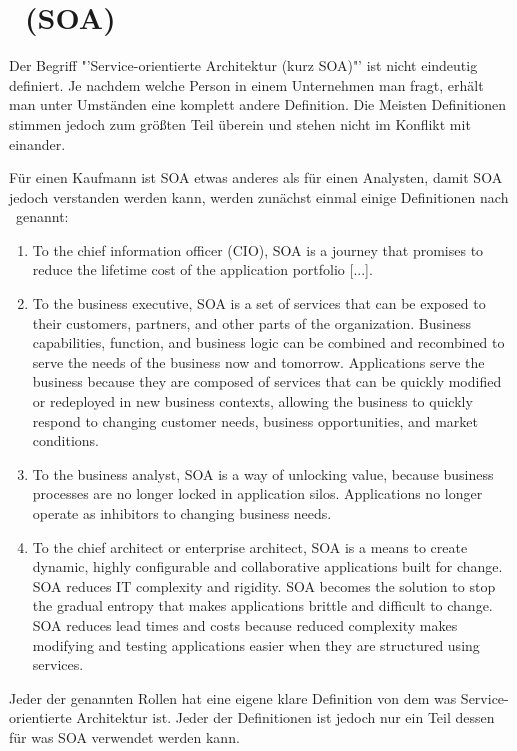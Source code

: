\chapter{\SOA\ (SOA)}
\label{chap:soa}
Der Begriff "'Service-orientierte Architektur (kurz SOA)"' ist nicht eindeutig definiert. Je nachdem welche Person in einem Unternehmen man fragt, erhält man unter Umständen eine komplett andere Definition. \frqq Die Meisten Definitionen stimmen jedoch zum größten Teil überein und stehen nicht im Konflikt mit einander.\flqq\cite[vgl. Seite 6]{100QA}

Für einen Kaufmann ist SOA etwas anderes als für einen Analysten, damit SOA jedoch verstanden werden kann, werden zunächst einmal einige Definitionen nach \cite{100QA}\ genannt:
\begin{enumerate}
       \item \frqq To the chief information officer (CIO), SOA is a journey that
       promises to reduce the lifetime cost of the application portfolio [...].\flqq \cite[vgl. Seite 6]{100QA}
    
       \item \frqq To the business executive, SOA is a set of services that can be exposed to their customers, partners, and other parts of the organization. Business capabilities, function, and business logic can be combined and recombined to serve the needs of the business now and tomorrow. Applications serve the business because they are composed
       of services that can be quickly modified or redeployed in new
       business contexts, allowing the business to quickly respond to changing
       customer needs, business opportunities, and market conditions.\flqq \cite[vgl. Seite 6]{100QA}
       
       \item \frqq To the business analyst, SOA is a way of unlocking value, because business processes are no longer locked in application silos. Applications no longer operate as inhibitors to changing business needs.\flqq \cite[vgl. Seite 6]{100QA}
       
       \item \frqq To the chief architect or enterprise architect, SOA is a means to
       create dynamic, highly configurable and collaborative applications
       built for change. SOA reduces IT complexity and rigidity. SOA becomes the solution to stop the gradual entropy that makes applications
       brittle and difficult to change. SOA reduces lead times and costs
       because reduced complexity makes modifying and testing applications
       easier when they are structured using services.\flqq \cite[vgl. Seite ]{100QA}
\end{enumerate}
Jeder der genannten Rollen hat eine eigene klare Definition von dem was Service-orientierte Architektur ist. Jeder der Definitionen ist jedoch nur ein Teil dessen für was SOA verwendet werden kann.

